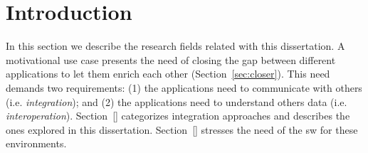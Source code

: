 \section{Introduction}
\label{sec:soa_intro}

In this section we describe the research fields related with this dissertation.
A motivational use case presents the need of closing the gap between different applications to let them enrich each other (Section~\ref{sec:closer}).
This need demands two requirements:
(1) the applications need to communicate with others (i.e. \emph{integration}); and
(2) the applications need to understand others data (i.e. \emph{interoperation}).
Section~\ref{} categorizes integration approaches and describes the ones explored in this dissertation.
Section~\ref{} stresses the need of the \acl{sw} for these environments.




